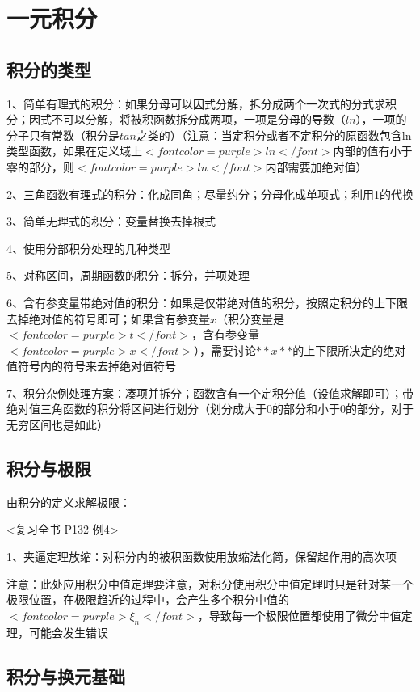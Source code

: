 \chapter{一元积分}

\section{积分的类型}

1、简单有理式的积分：如果分母可以因式分解，拆分成两个一次式的分式求积分；因式不可以分解，将被积函数拆分成两项，一项是分母的导数（$ ln $），一项的分子只有常数（积分是$ tan $之类的）（注意：当定积分或者不定积分的原函数包含ln类型函数，如果在定义域上$ <font color=purple>ln</font> $内部的值有小于零的部分，则$ <font color=purple>ln</font> $内部需要加绝对值）

2、三角函数有理式的积分：化成同角；尽量约分；分母化成单项式；利用1的代换

3、简单无理式的积分：变量替换去掉根式

4、使用分部积分处理的几种类型

5、对称区间，周期函数的积分：拆分，并项处理

6、含有参变量带绝对值的积分：如果是仅带绝对值的积分，按照定积分的上下限去掉绝对值的符号即可；如果含有参变量$ x $（积分变量是$ <font color=purple>t</font> $，含有参变量$ <font color=purple>x</font> $），需要讨论$ **x** $的上下限所决定的绝对值符号内的符号来去掉绝对值符号

7、积分杂例处理方案：凑项并拆分；函数含有一个定积分值（设值求解即可）；带绝对值三角函数的积分将区间进行划分（划分成大于0的部分和小于0的部分，对于无穷区间也是如此）

\section{积分与极限}

由积分的定义求解极限：

<复习全书 P132 例4>

1、夹逼定理放缩：对积分内的被积函数使用放缩法化简，保留起作用的高次项

注意：此处应用积分中值定理要注意，对积分使用积分中值定理时只是针对某一个极限位置，在极限趋近的过程中，会产生多个积分中值的$ <font color=purple>\xi_n</font> $，导致每一个极限位置都使用了微分中值定理，可能会发生错误

\section{积分与换元基础}



